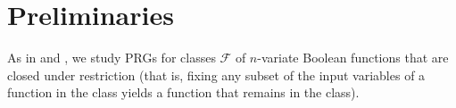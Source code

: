 






































































\setcounter{section}{1}\setcounter{theorem}{6}\setcounter{equation}{1}\section{Preliminaries}
\label{sec:preliminaries}
As in \cite{CHHL} and \cite{CHLT}, we study PRGs for classes $\mathcal{F}$ of $n$-variate Boolean functions that are closed under restriction (that is, fixing any subset of the input variables of a function in the class yields a function that remains in the class). 















































